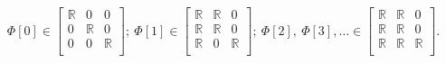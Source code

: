 \begin{equation*}
\Phi[0] \in \left[
\begin{array}{ccc}
\mathbb{R} & 0 & 0\\
0 & \mathbb{R} & 0\\
0 & 0 & \mathbb{R}\\
\end{array}
\right];\ 
\Phi[1] \in \left[
\begin{array}{ccc}
\mathbb{R} & \mathbb{R} & 0\\
\mathbb{R} & \mathbb{R} & 0\\
\mathbb{R} & 0 & \mathbb{R}\\
\end{array}
\right];\ 
\Phi[2],\ \Phi[3],\hdots \in \left[
\begin{array}{ccc}
\mathbb{R} & \mathbb{R} & 0\\
\mathbb{R} & \mathbb{R} & 0\\
\mathbb{R} & \mathbb{R} & \mathbb{R}\\
\end{array}
\right].
\end{equation*}









